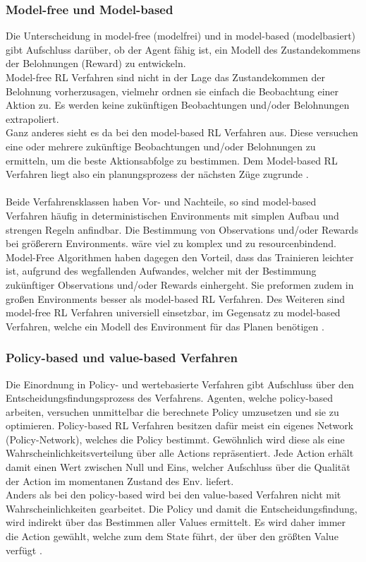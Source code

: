 \subsubsection{Model-free und Model-based}
Die Unterscheidung in model-free (modelfrei) und in model-based (modelbasiert) gibt Aufschluss darüber, ob der Agent fähig ist, ein Modell des Zustandekommens der Belohnungen (Reward) zu entwickeln.\\
Model-free RL Verfahren sind nicht in der Lage das Zustandekommen der Belohnung vorherzusagen, vielmehr ordnen sie einfach die Beobachtung einer Aktion zu. Es werden keine zukünftigen Beobachtungen und/oder Belohnungen extrapoliert.\\
Ganz anderes sieht es da bei den model-based RL Verfahren aus. Diese versuchen eine oder mehrere zukünftige Beobachtungen und/oder Belohnungen zu ermitteln, um die beste Aktionsabfolge zu bestimmen. Dem Model-based RL Verfahren liegt also ein planungsprozess der nächsten Züge zugrunde \cite{Sutton1998}.\\
\\Beide Verfahrensklassen haben Vor- und Nachteile, so sind model-based Verfahren häufig in deterministischen Environments mit simplen Aufbau und strengen Regeln anfindbar. Die Bestimmung von Observations und/oder Rewards bei größerern Environments. wäre viel zu komplex und zu resourcenbindend.
\\Model-Free Algorithmen haben dagegen den Vorteil, dass das Trainieren leichter ist, aufgrund des wegfallenden Aufwandes, welcher mit der Bestimmung zukünftiger Observations und/oder Rewards einhergeht. Sie preformen zudem in großen Environments besser als model-based RL Verfahren. Des Weiteren sind model-free RL Verfahren universiell einsetzbar, im Gegensatz zu model-based Verfahren, welche ein Modell des Environment für das Planen benötigen  \cite{DRL, Sutton1998}.

\subsubsection{Policy-based und value-based Verfahren}
\label{RL_policy_value}
Die Einordnung in Policy- und wertebasierte Verfahren gibt Aufschluss über den Entscheidungsfindungsprozess des Verfahrens.
Agenten, welche policy-based arbeiten, versuchen unmittelbar die berechnete Policy umzusetzen und sie zu optimieren. Policy-based RL Verfahren besitzen dafür meist ein eigenes Network (Policy-Network), welches die Policy bestimmt.
Gewöhnlich wird diese als eine Wahrscheinlichkeitsverteilung über alle Actions repräsentiert. Jede Action erhält damit einen Wert zwischen Null und Eins, welcher Aufschluss über die Qualität der Action im momentanen Zustand des Env. liefert.\\
Anders als bei den policy-based wird bei den value-based Verfahren nicht mit Wahrscheinlichkeiten gearbeitet. Die Policy und damit die Entscheidungsfindung, wird indirekt über das Bestimmen aller Values ermittelt. Es wird daher immer die Action gewählt, welche zum dem State führt, der über den größten Value verfügt \cite{DRL}.

